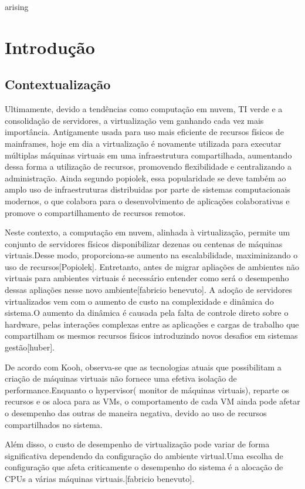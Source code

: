 arising\chapter{Introdução}
\section{Contextualizaç\~ao}
Ultimamente, devido a tendências como computação em nuvem, TI verde e a consolidação de servidores, a virtualização vem ganhando cada vez mais importância. Antigamente usada para uso mais eficiente de recursos físicos de mainframes, hoje em dia a virtualização é novamente utilizada para executar múltiplas máquinas virtuais em uma infraestrutura compartilhada, aumentando dessa forma a utilização de recursos, promovendo flexibilidade e centralizando a administração\cite{huber2011}. Ainda segundo popiolek, essa popularidade se deve também ao amplo uso de infraestruturas distribuidas por parte de sistemas computacionais modernos, o que colabora para o desenvolvimento de aplicações colaborativas e promove o compartilhamento de recursos remotos.

Neste contexto, a computação em nuvem, alinhada à virtualização, permite um conjunto de servidores físicos disponibilizar dezenas ou centenas de máquinas virtuais.Desse modo, proporciona-se aumento na escalabilidade, maximinizando o uso de recursos[Popiolek]. Entretanto, antes de migrar apliações de ambientes não virtuais para ambientes virtuais é necessário entender como será o desempenho dessas apliações nesse novo ambiente[fabricio benevuto]. A adoção de servidores virtualizados vem com o aumento de custo na complexidade e dinâmica do sistema.O aumento da dinâmica é causada pela falta de controle direto sobre o hardware, pelas interações complexas entre as aplicações e cargas de trabalho que compartilham os mesmos recursos físicos introduzindo novos desafios em sistemas gestão[huber].

De acordo com Kooh, observa-se que as tecnologias atuais que possibilitam a criação de máquinas virtuais não fornece uma efetiva isolação de performance.Enquanto o hypervisor( monitor de máquinas virtuais), reparte os recursos e os aloca para as VMs, o comportamento de cada VM ainda pode afetar o desempenho das outras de maneira negativa, devido ao uso de recursos compartilhados no sistema.  

Além disso, o custo de desempenho de virtualização pode variar de forma significativa dependendo da configuração do ambiente virtual.Uma escolha de configuração que afeta criticamente o desempenho do sistema é a alocação de CPUs a várias máquinas virtuais.[fabricio benevuto].

